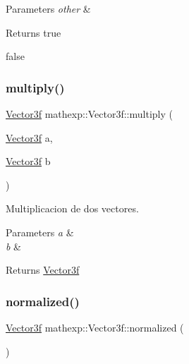 \begin{DoxyParams}{Parameters}
{\em other} & \\
\hline
\end{DoxyParams}
\begin{DoxyReturn}{Returns}
true 

false 
\end{DoxyReturn}
\mbox{\label{structmathexp_1_1_vector3f_ae7ce33c088faa2d6847c7d6fa3fd891b}} 
\subsubsection{\texorpdfstring{multiply()}{multiply()}}
{\footnotesize\ttfamily \mbox{\hyperlink{structmathexp_1_1_vector3f}{Vector3f}} mathexp\+::\+Vector3f\+::multiply (\begin{DoxyParamCaption}\item[{\mbox{\hyperlink{structmathexp_1_1_vector3f}{Vector3f}}}]{a,  }\item[{\mbox{\hyperlink{structmathexp_1_1_vector3f}{Vector3f}}}]{b }\end{DoxyParamCaption})\hspace{0.3cm}{\ttfamily [static]}}



Multiplicacion de dos vectores. 


\begin{DoxyParams}{Parameters}
{\em a} & \\
\hline
{\em b} & \\
\hline
\end{DoxyParams}
\begin{DoxyReturn}{Returns}
\mbox{\hyperlink{structmathexp_1_1_vector3f}{Vector3f}} 
\end{DoxyReturn}
\mbox{\label{structmathexp_1_1_vector3f_a6ecf77a8fb0cd21fc14f07f32c48612d}} 
\subsubsection{\texorpdfstring{normalized()}{normalized()}}
{\footnotesize\ttfamily \mbox{\hyperlink{structmathexp_1_1_vector3f}{Vector3f}} mathexp\+::\+Vector3f\+::normalized (\begin{DoxyParamCaption}{ }\end{DoxyParamCaption})}



